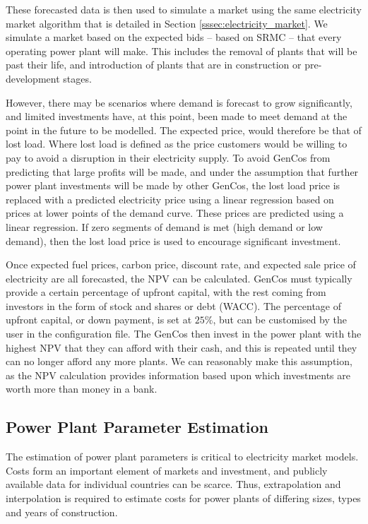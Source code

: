 These forecasted data is then used to simulate a market using the same electricity market algorithm that is detailed in Section \ref{sssec:electricity_market}. We simulate a market based on the expected bids -- based on SRMC -- that every operating power plant will make. This includes the removal of plants that will be past their life, and introduction of plants that are in construction or pre-development stages. 

However, there may be scenarios where demand is forecast to grow significantly, and limited investments have, at this point, been made to meet demand at the point in the future to be modelled. The expected price, would therefore be that of lost load. Where lost load is defined as the price customers would be willing to pay to avoid a disruption in their electricity supply. To avoid GenCos from predicting that large profits will be made, and under the assumption that further power plant investments will be made by other GenCos, the lost load price is replaced with a predicted electricity price using a linear regression based on prices at lower points of the demand curve. These prices are predicted using a linear regression. If zero segments of demand is met (high demand or low demand), then the lost load price is used to encourage significant investment.

Once expected fuel prices, carbon price, discount rate, and expected sale price of electricity are all forecasted, the NPV can be calculated. GenCos must typically provide a certain percentage of upfront capital, with the rest coming from investors in the form of stock and shares or debt (WACC). The percentage of upfront capital, or down payment, is set at $25\%$, but can be customised by the user in the configuration file. The GenCos then invest in the power plant with the highest NPV that they can afford with their cash, and this is repeated until they can no longer afford any more plants. We can reasonably make this assumption, as the NPV calculation provides information based upon which investments are worth more than money in a bank.

\subsection{Power Plant Parameter Estimation}

The estimation of power plant parameters is critical to electricity market models. Costs form an important element of markets and investment, and publicly available data for individual countries can be scarce. Thus, extrapolation and interpolation is required to estimate costs for power plants of differing sizes, types and years of construction.

